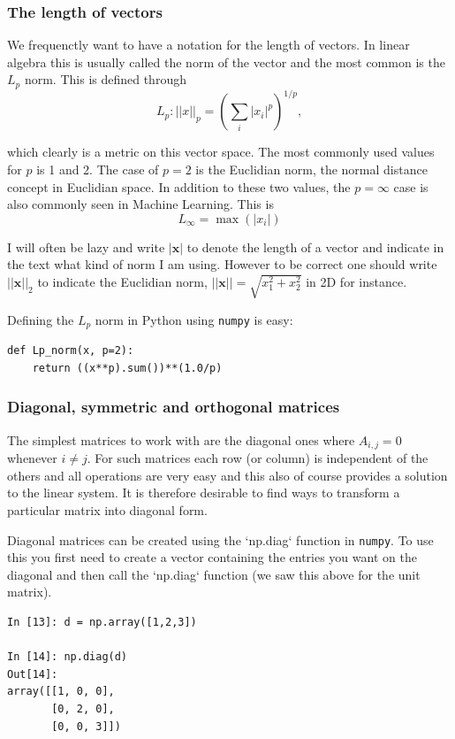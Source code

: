 \documentclass[a4paper,10pt]{article}
\begin{document}
\subsubsection{ The length of vectors}

We frequenctly want to have a notation for the length of vectors. In linear algebra this is usually called the norm of the vector and the most common is the $L_p$ norm. This is defined through
$$L_p : ||x||_p = \left(\sum_i \left|x_i \right|^p\right)^{1/p}, $$

which clearly is a metric on this vector space. The most commonly used values for $p$ is 1 and 2. The case of $p=2$ is the Euclidian norm, the normal distance concept in Euclidian space. In addition to these two values, the $p=\infty$ case is also commonly seen in Machine Learning. This is
$$L_\infty = \max \left(|x_i|\right)$$

I will often be lazy and write $|\mathbf{x}|$ to denote the length of a vector and indicate in the text what kind of norm I am using. However to be correct one should write $||\mathbf{x}||_2$ to indicate the Euclidian norm, $||\mathbf{x}|| = \sqrt{x_1^2 + x_2^2}$ in 2D for instance.

Defining the $L_p$ norm in Python using \texttt{numpy} is easy:
\begin{lstlisting}
def Lp_norm(x, p=2):
    return ((x**p).sum())**(1.0/p)
\end{lstlisting}

\subsubsection{ Diagonal, symmetric and orthogonal matrices}

The simplest matrices to work with are the diagonal ones where $A_{i,j}=0$ whenever $i\ne j$. For such matrices each row (or column) is independent of the others and all operations are very easy and this also of course provides a solution to the linear system. It is therefore desirable to find ways to transform a particular matrix into diagonal form. 

Diagonal matrices can be created using the `np.diag` function in \texttt{numpy}. To use this you first need to create a vector containing the entries you want on the diagonal and then call the `np.diag` function (we saw this above for the unit matrix).
\begin{lstlisting}
In [13]: d = np.array([1,2,3])

In [14]: np.diag(d)
Out[14]: 
array([[1, 0, 0],
       [0, 2, 0],
       [0, 0, 3]])

\end{lstlisting}
\end{document}
